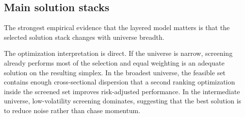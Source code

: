 \documentclass[11pt,a4paper]{article}
\begin{document}
\subsection{Main solution stacks}
The strongest empirical evidence that the layered model matters is that the selected solution stack changes with universe breadth.
\begin{table}[H]
\centering
\caption{Best screen/controller stack by candidate-universe breadth. Values are mean walk-forward metrics at 10 bps transaction cost.}
\label{tab:winners_math}
\small
{}
\end{table}
The optimization interpretation is direct. If the universe is narrow, screening already performs most of the selection and equal weighting is an adequate solution on the resulting simplex. In the broadest universe, the feasible set contains enough cross-sectional dispersion that a second ranking optimization inside the screened set improves risk-adjusted performance. In the intermediate universe, low-volatility screening dominates, suggesting that the best solution is to reduce noise rather than chase momentum.
\end{document}
